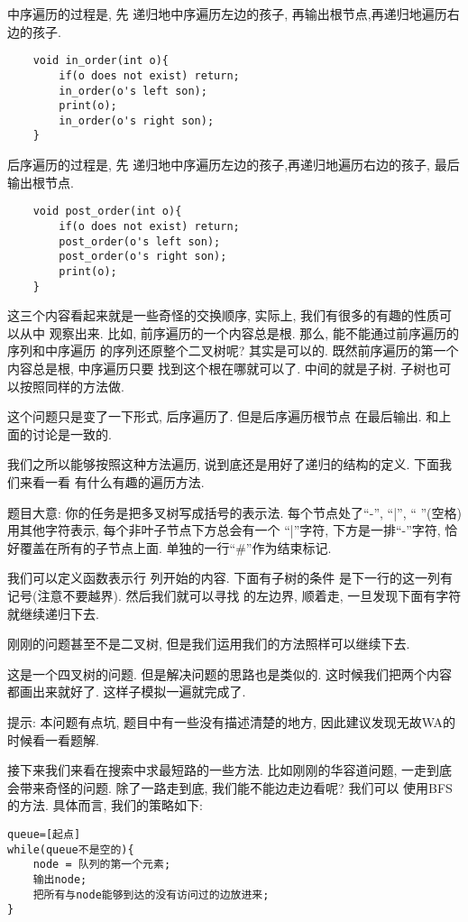 中序遍历的过程是, 先
递归地中序遍历左边的孩子, 再输出根节点,再递归地遍历右边的孩子. 
\begin{lstlisting}
    void in_order(int o){
        if(o does not exist) return;
        in_order(o's left son);
        print(o);
        in_order(o's right son);
    }
\end{lstlisting}

 后序遍历的过程是, 先
递归地中序遍历左边的孩子,再递归地遍历右边的孩子, 最后输出根节点. 
\begin{lstlisting}
    void post_order(int o){
        if(o does not exist) return;
        post_order(o's left son);
        post_order(o's right son);
        print(o);
    }
\end{lstlisting}

这三个内容看起来就是一些奇怪的交换顺序, 实际上, 我们有很多的有趣的性质可以从中
观察出来. 比如, 前序遍历的一个内容总是根. 那么, 能不能通过前序遍历的序列和中序遍历
的序列还原整个二叉树呢? 其实是可以的. 既然前序遍历的第一个内容总是根, 中序遍历只要
找到这个根在哪就可以了. 中间的就是子树. 子树也可以按照同样的方法做. 

 这个问题只是变了一下形式, 后序遍历了. 但是后序遍历根节点
在最后输出. 和上面的讨论是一致的. 

我们之所以能够按照这种方法遍历, 说到底还是用好了递归的结构的定义. 下面我们来看一看
有什么有趣的遍历方法. 

 题目大意: 你的任务是把多叉树写成括号的表示法. 
每个节点处了``-'', ``|'', `` ''(空格)用其他字符表示, 每个非叶子节点下方总会有一个
``|''字符, 下方是一排``-''字符, 恰好覆盖在所有的子节点上面. 单独的一行``\#''作为结束标记.

我们可以定义函数表示行 列开始的内容. 下面有子树的条件
是下一行的这一列有\cw{|}记号(注意不要越界). 然后我们就可以寻找\cw{-} 的左边界, 
顺着\cw{-}走, 一旦发现下面有字符就继续递归下去. 

刚刚的问题甚至不是二叉树, 但是我们运用我们的方法照样可以继续下去. 

 这是一个四叉树的问题. 但是解决问题的思路也是类似的. 
这时候我们把两个内容都画出来就好了. 这样子模拟一遍就完成了. 

 提示: 本问题有点坑, 题目中有一些没有描述清楚的地方, 
因此建议发现无故WA的时候看一看题解. 

接下来我们来看在搜索中求最短路的一些方法. 比如刚刚的华容道问题, 一走到底会带来奇怪的问题. 
除了一路走到底, 我们能不能边走边看呢? 我们可以
使用BFS的方法. 具体而言, 我们的策略如下: 
\begin{lstlisting}
queue=[起点]
while(queue不是空的){
    node = 队列的第一个元素;
    输出node;
    把所有与node能够到达的没有访问过的边放进来;
}
\end{lstlisting}

